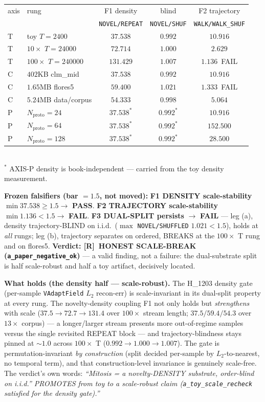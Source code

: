 \documentclass[11pt,a4paper]{article}
\providecommand{\tierRed}{\textbf{[R]}}
\begin{document}
\begin{center}
\small
\begin{tabular}{llccc}
\toprule
axis & rung & F1 density & blind & F2 trajectory \\
     &      & \texttt{NOVEL/REPEAT} & \texttt{NOVEL/SHUF} & \texttt{WALK/WALK\_SHUF} \\
\midrule
T & toy $T{=}2400$        & $37.538$  & $0.992$ & $10.916$ \\
T & $10\times$ $T{=}24000$   & $72.714$  & $1.000$ & $2.629$ \\
T & $100\times$ $T{=}240000$ & $131.429$ & $1.007$ & $1.136$~FAIL \\
C & $402$KB clm\_mid      & $37.538$  & $0.992$ & $10.916$ \\
C & $1.65$MB flores5      & $59.400$  & $1.021$ & $1.333$~FAIL \\
C & $5.24$MB data/corpus  & $54.333$  & $0.998$ & $5.064$ \\
P & $N_{\text{proto}}{=}24$  & $37.538^\ast$ & $0.992^\ast$ & $10.916$ \\
P & $N_{\text{proto}}{=}64$  & $37.538^\ast$ & $0.992^\ast$ & $152.500$ \\
P & $N_{\text{proto}}{=}128$ & $37.538^\ast$ & $0.992^\ast$ & $28.500$ \\
\bottomrule
\end{tabular}
\\[2pt]
{\footnotesize $^\ast$ AXIS-P density is book-independent --- carried from the toy
density measurement.}
\end{center}

\noindent\textbf{Frozen falsifiers (bar $=1.5$, not moved):}
\textbf{F1 DENSITY scale-stability} $\min 37.538 \ge 1.5 \to$ \textbf{PASS}.
\textbf{F2 TRAJECTORY scale-stability} $\min 1.136 < 1.5 \to$ \textbf{FAIL}.
\textbf{F3 DUAL-SPLIT persists} $\to$ \textbf{FAIL} --- leg (a), density
trajectory-BLIND on i.i.d.\ ($\max$ \texttt{NOVEL/SHUFFLED} $1.021 < 1.5$), holds
at \emph{all} rungs; leg (b), trajectory separates on ordered, BREAKS at the
$100\times$ T rung and on flores5. \textbf{Verdict: \tierRed\ HONEST SCALE-BREAK
(\texttt{a\_paper\_negative\_ok})} --- a valid finding, not a failure: the
dual-substrate split is half scale-robust and half a toy artifact, decisively
located.

\textbf{What holds (the density half --- scale-robust).} The H\_1203 density gate
(per-sample \texttt{VAdaptField} $L_2$ recon-err) is scale-invariant in its
dual-split property at every rung. The novelty-density coupling F1 not only holds
but \emph{strengthens} with scale ($37.5 \to 72.7 \to 131.4$ over $100\times$
stream length; $37.5/59.4/54.3$ over $13\times$ corpus) --- a longer/larger stream
presents more out-of-regime samples versus the single revisited REPEAT block ---
and trajectory-blindness stays pinned at $\sim\!1.0$ across $100\times$ T
($0.992 \to 1.000 \to 1.007$). The gate is permutation-invariant \emph{by
construction} (split decided per-sample by $L_2$-to-nearest, no temporal term),
and that construction-level invariance is genuinely scale-free. The verdict's
own words: \emph{``Mitosis = a novelty-DENSITY substrate, order-blind on i.i.d.''
PROMOTES from toy to a scale-robust claim (\texttt{a\_toy\_scale\_recheck}
satisfied for the density gate).''}
\end{document}
